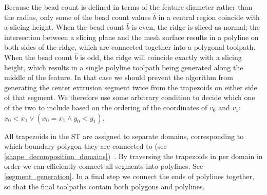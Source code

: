 Because the bead count is defined in terms of the feature diameter rather than the radius, only some of the bead count values $\hat{b}$ in a central region coincide with a slicing height.
When the bead count $\hat{b}$ is even, the ridge is sliced as normal;
the intersection between a slicing plane and the mesh surface results in a polyline on both sides of the ridge, which are connected together into a polygonal toolpath.
When the bead count $\hat{b}$ is odd, the ridge will coincide exactly with a slicing height, which results in a single polyline toolpath being generated along the middle of the feature.
In that case we should prevent the algorithm from generating the center extrusion segment twice from the trapezoids on either side of that segment.
We therefore use some arbitrary condition to decide which one of the two to include based on the ordering of the coordinates of $v_0$ and $v_1$: $x_0 < x_1 \lor (x_0 = x_1 \land y_0 < y_1)$.

All trapezoids in the ST are assigned to separate domains, corresponding to which boundary polygon they are connected to (see \cref{shape_decomposition_domains})~\cite{Ding2016a}.
By traversing the trapezoids in per domain in order we can efficiently connect all segments into polylines.
See \cref{segment_generation}.
In a final step we connect the ends of polylines together, so that the final toolpaths contain both polygons and polylines.

